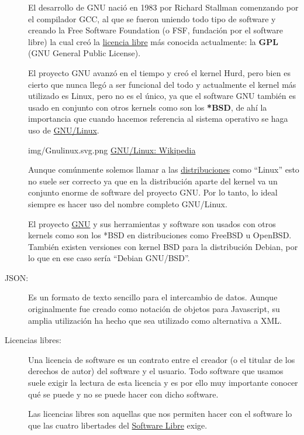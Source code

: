 \begin{description}
    El desarrollo de GNU nació en 1983 por Richard Stallman comenzando por el compilador GCC, al que se fueron uniendo todo tipo de software y creando la Free Software Foundation (o FSF, fundación por el software libre) la cual creó la \hyperlink{licencias_libres}{licencia libre} más conocida actualmente: la \textbf{GPL} (GNU General Public License).

    El proyecto GNU avanzó en el tiempo y creó el kernel Hurd, pero bien es cierto que nunca llegó a ser funcional del todo y actualmente el kernel más utilizado es Linux, pero no es el único, ya que el software GNU también es usado en conjunto con otros kernels como son los \textbf{*BSD}, de ahí la importancia que cuando hacemos referencia al sistema operativo se haga uso de \hyperlink{gnu_linux}{GNU/Linux}.

    \hypertarget{gnu_linux}{}

    {img/Gnulinux.svg.png}
    {\href{https://es.wikipedia.org/wiki/GNU/Linux\#/media/Archivo:Gnulinux.svg}{GNU/Linux: Wikipedia}}
    {
        Aunque comúnmente solemos llamar a las \hyperlink{distribucion_gnu_linux}{distribuciones} como “Linux” esto no suele ser correcto ya que en la distribución aparte del kernel va un conjunto enorme de software del proyecto GNU. Por lo tanto, lo ideal siempre es hacer uso del nombre completo GNU/Linux.

        El proyecto \hyperlink{gnu}{GNU} y sus herramientas y software son usados con otros kernels como son los *BSD en distribuciones como FreeBSD u OpenBSD. También existen versiones con kernel BSD para la distribución Debian, por lo que en ese caso sería “Debian GNU/BSD”.
    }


    \hypertarget{json}{}
    \item[JSON:] Es un formato de texto sencillo para el intercambio de datos. Aunque originalmente fue creado como notación de objetos para Javascript, su amplia utilización ha hecho que sea utilizado como alternativa a XML.


    \hypertarget{licencias_libres}{}
    \item[Licencias libres:] Una licencia de software es un contrato entre el creador (o el titular de los derechos de autor) del software y el usuario. Todo software que usamos suele exigir la lectura de esta licencia y es por ello muy importante conocer qué se puede y no se puede hacer con dicho software.

    Las licencias libres son aquellas que nos permiten hacer con el software lo que las cuatro libertades del \hyperlink{software_libre}{Software Libre} exige.


\end{description}
